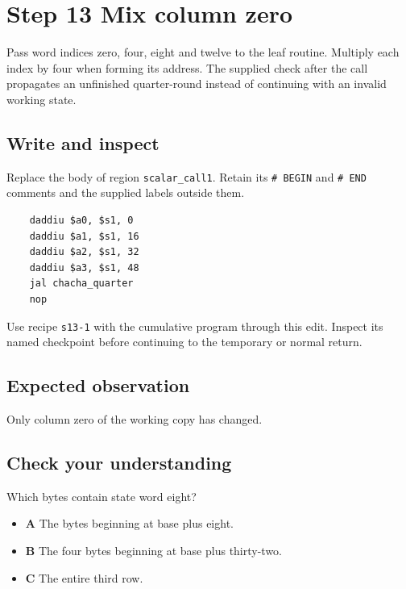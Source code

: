 \section{Step 13 Mix column zero}\label{chacha-s13}

Pass word indices zero, four, eight and twelve to the leaf routine. Multiply each index by four when forming its address. The supplied check after the call propagates an unfinished quarter-round instead of continuing with an invalid working state.

\subsection{Write and inspect}
Replace the body of region \texttt{scalar\_call1}. Retain its \texttt{\# BEGIN} and \texttt{\# END} comments and the supplied labels outside them.

\begin{verbatim}
    daddiu $a0, $s1, 0
    daddiu $a1, $s1, 16
    daddiu $a2, $s1, 32
    daddiu $a3, $s1, 48
    jal chacha_quarter
    nop
\end{verbatim}

Use recipe \texttt{s13-1} with the cumulative program through this edit. Inspect its named checkpoint before continuing to the temporary or normal return.

\subsection{Expected observation}
Only column zero of the working copy has changed.

\subsection{Check your understanding}
Which bytes contain state word eight?

\begin{itemize}
  \item \textbf{A} The bytes beginning at base plus eight.
  \item \textbf{B} The four bytes beginning at base plus thirty-two.
  \item \textbf{C} The entire third row.
\end{itemize}
